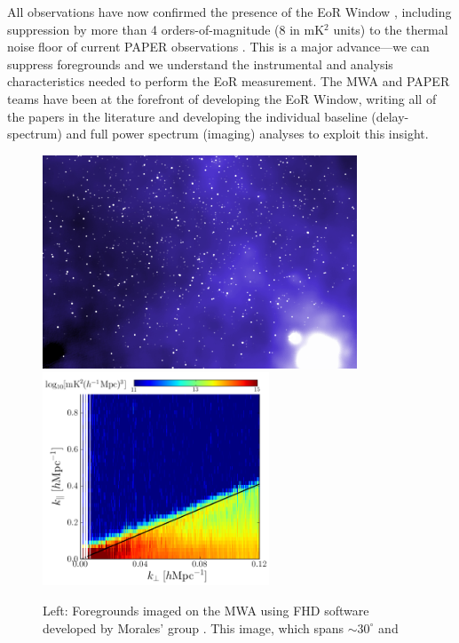 \documentclass[preprint]{aastex}
\begin{document}
All observations have now confirmed the presence of the EoR Window
\citep{pober_et_al2013,dillon_et_al2013b_trunc}, including suppression by more than 4
orders-of-magnitude (8 in mK$^{2}$ units) to the thermal noise floor of current
PAPER observations \citep{parsons_et_al2013}. This is a major advance---we can
suppress foregrounds and we understand the instrumental and analysis
characteristics needed to perform the EoR measurement. The MWA and PAPER teams
have been at the forefront of developing the EoR Window, writing all of the
papers in the literature and developing the individual baseline
(delay-spectrum) and full power spectrum (imaging) analyses to exploit this
insight. 




\begin{figure}[t] \centering
\includegraphics[height=2.5in]{plots/MWApretty_crop.png} 
~ %
\includegraphics[height=2.5in]{plots/wedge_tall_wide.png} \caption{\small Left:
Foregrounds imaged on the MWA using FHD software developed by Morales' group
\citep{sullivan_et_al2012_trunc}.  This image, which spans $\sim$$30^{\circ}$ and
$$}
\end{figure}
\end{document}

